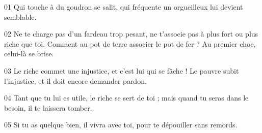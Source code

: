 01 Qui touche à du goudron se salit, qui fréquente un orgueilleux lui devient semblable.

02 Ne te charge pas d’un fardeau trop pesant, ne t’associe pas à plus fort ou plus riche que toi. Comment au pot de terre associer le pot de fer ? Au premier choc, celui-là se brise.

03 Le riche commet une injustice, et c’est lui qui se fâche ! Le pauvre subit l’injustice, et il doit encore demander pardon.

04 Tant que tu lui es utile, le riche se sert de toi ; mais quand tu seras dans le besoin, il te laissera tomber.

05 Si tu as quelque bien, il vivra avec toi, pour te dépouiller sans remords.
